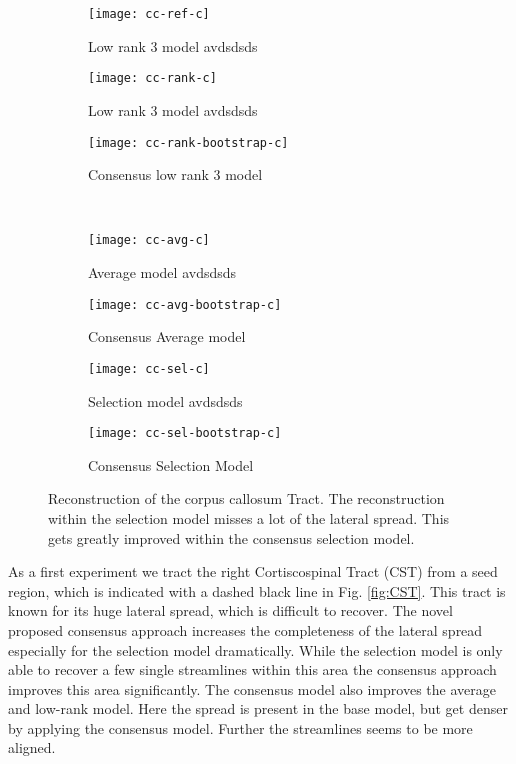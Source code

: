 \begin{figure*}[t]
	\centering
\begin{subfigure}[b]{0.23\linewidth}
		\texttt{[image: cc-ref-c]}
		\caption{Low rank 3 model {\color{white} avdsdsds} }
	\end{subfigure}
	\hspace{0.01\linewidth}
	\begin{subfigure}[b]{0.23\linewidth}
		\texttt{[image: cc-rank-c]}
		\caption{Low rank 3 model {\color{white} avdsdsds} }
	\end{subfigure}
	\hspace{0.01\linewidth}
	\begin{subfigure}[b]{0.23\linewidth}
		\texttt{[image: cc-rank-bootstrap-c]}
		\caption{Consensus low rank 3 model}
\end{subfigure} \\ 
	\begin{subfigure}[b]{0.23\linewidth}
		\texttt{[image: cc-avg-c]}
		\caption{Average model {\color{white} avdsdsds}}
\end{subfigure} 
	\hspace{0.01\linewidth}
	\begin{subfigure}[b]{0.23\linewidth}
		\texttt{[image: cc-avg-bootstrap-c]}
		\caption{Consensus Average model}
\end{subfigure} 
	\hspace{0.01\linewidth}
\begin{subfigure}[b]{0.23\linewidth}
		\texttt{[image: cc-sel-c]}
		\caption{Selection model {\color{white} avdsdsds}}
	\end{subfigure}
	\hspace{0.01\linewidth}
	\begin{subfigure}[b]{0.23\linewidth}
		\texttt{[image: cc-sel-bootstrap-c]}
		\caption{Consensus Selection Model}
\end{subfigure} 
\caption{Reconstruction of the corpus callosum Tract. The reconstruction within the
selection model misses a lot of the lateral spread. This gets greatly improved
within the consensus selection model. }
	\label{fig:CC}
\end{figure*}

As a first experiment we tract the right Cortiscospinal Tract (CST) from a seed
region, which is indicated with a dashed black line in Fig. \ref{fig:CST}. This tract is
known for its huge lateral spread, which is difficult to recover. The
novel proposed consensus approach increases the completeness of the lateral
spread especially for the selection model dramatically. While the selection
model is only able to recover a few single streamlines within this area the
consensus approach improves this area significantly. The consensus model also
improves the average and low-rank model. Here the spread is present in the base
model, but get denser by applying the consensus model. Further the streamlines
seems to be more aligned.

